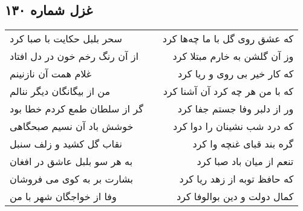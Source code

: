 \begin{center}
\section*{غزل شماره ۱۳۰}
\label{sec:sh130}
\begin{longtable}{l p{0.5cm} r}
سحر بلبل حکایت با صبا کرد
&&
که عشق روی گل با ما چه‌ها کرد
\\
از آن رنگ رخم خون در دل افتاد
&&
وز آن گلشن به خارم مبتلا کرد
\\
غلام همت آن نازنینم
&&
که کار خیر بی روی و ریا کرد
\\
من از بیگانگان دیگر ننالم
&&
که با من هر چه کرد آن آشنا کرد
\\
گر از سلطان طمع کردم خطا بود
&&
ور از دلبر وفا جستم جفا کرد
\\
خوشش باد آن نسیم صبحگاهی
&&
که درد شب نشینان را دوا کرد
\\
نقاب گل کشید و زلف سنبل
&&
گره بند قبای غنچه وا کرد
\\
به هر سو بلبل عاشق در افغان
&&
تنعم از میان باد صبا کرد
\\
بشارت بر به کوی می فروشان
&&
که حافظ توبه از زهد ریا کرد
\\
وفا از خواجگان شهر با من
&&
کمال دولت و دین بوالوفا کرد
\\
\end{longtable}
\end{center}
